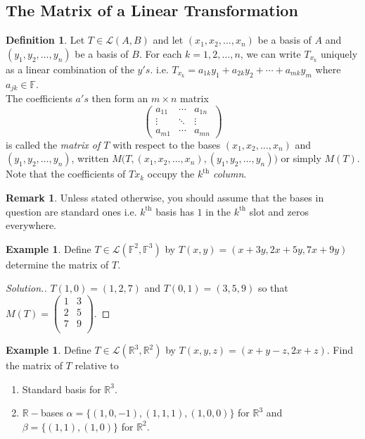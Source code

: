 \documentclass[11pt,a4paper]{article}
\theoremstyle{definition}
\newtheorem{defn}[thm]{Definition}
\newtheorem{exa}[thm]{Example}
\newtheorem*{remark}{Remark}
\newenvironment{solution}
  {\renewcommand{\qedsymbol}{}\begin{proof}[\textit{Solution}.]}
  {\end{proof}}
\begin{document}
\subsection{The Matrix of a Linear Transformation}
\begin{defn}
Let $T\in \mathcal{L}(A,B)$ and let $(x_1,x_2,\dots,x_n)$ be a basis of $A$ and $(y_1,y_2,\dots,y_n)$ be a basis of $B$. For each $k=1,2,\dots, n$, we can write $T_{x_k}$ uniquely as a linear combination of the $y's$. i.e. $T_{x_k}=a_{1k}y_1+a_{2k}y_2+\cdots+a_{mk}y_m$ where $a_{jk}\in \mathbb{F}$.\\ The coefficients $a's$ then form an $m\times n$ matrix$$
\begin{pmatrix}
a_{11}&\cdots&a_{1n}\\
\vdots&\ddots&\vdots\\
a_{m1}&\cdots&a_{mn}
\end{pmatrix}
$$
is called the \emph{matrix of $T$} with respect to the bases
$(x_1,x_2,\dots,x_n)$ and $(y_1,y_2,\dots,y_n)$, written
$M\Big(T,(x_1,x_2,\dots,x_n),(y_1,y_2,\dots,y_n)\Big)$ or simply $M(T)$. Note
that the coefficients of $Tx_k$ occupy the $k^{\text{th}}$ \emph{column}.
\end{defn}

\begin{remark}
Unless stated otherwise, you should assume that the bases in question are standard ones i.e. $k^{\text{th}}$ basis has $1$ in the $k^{\text{th}}$ slot and zeros everywhere.
\end{remark}


\begin{exa}
Define $T\in \mathcal{L}(\mathbb{F}^{2},\mathbb{F}^3)$ by $T(x,y)=(x+3y, 2x+5y, 7x+9y)$ determine the matrix of $T$.
\end{exa}

\begin{solution}
$T(1,0)=(1,2,7)$ and $T(0,1)=(3,5,9)$ so that $M(T)=
\begin{pmatrix}
1&3\\2&5\\7&9\\
\end{pmatrix}
$.
\end{solution}

\begin{exa}
Define $T\in \mathcal{L}(\mathbb{R}^3,\mathbb{R}^2)$ by $T(x,y,z)=(x+y-z, 2x+z)$. Find the matrix of $T$ relative to 
\begin{enumerate}
\item[i.] Standard basis for $\mathbb{R}^3$.
\item[ii.] $\mathbb{R}-$bases $\alpha =\{(1,0,-1), (1,1,1), (1,0,0)\}$ for $\mathbb{R}^3$ and $\beta=\{(1,1), (1,0)\}$ for $\mathbb{R}^2$.
\end{enumerate}
\end{exa}
\end{document}

